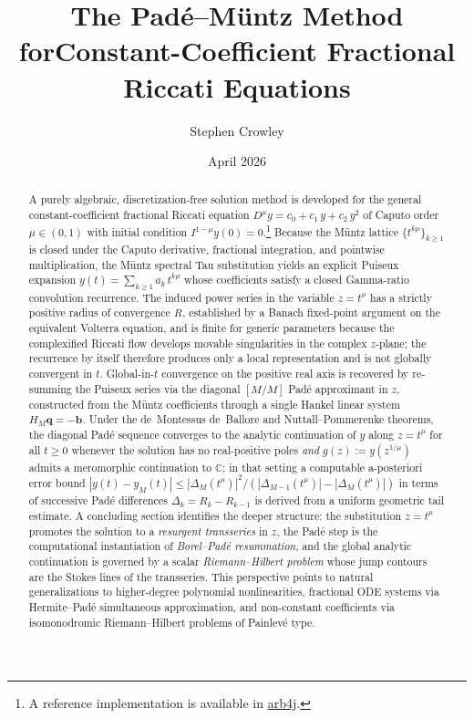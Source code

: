\documentclass[11pt,a4paper]{article}
\title{The Pad\'e--M\"untz Method forConstant-Coefficient Fractional Riccati Equations}}
\author{Stephen Crowley}
\date{April 2026}
\newcommand{\C}{\mathbb{C}}
\begin{document}
\maketitle

\begin{abstract}
A purely algebraic, discretization-free solution method is developed for the general constant-coefficient fractional Riccati equation
\(D^\mu y = c_0 + c_1\,y + c_2\,y^2\) of Caputo order \(\mu \in (0,1)\) with initial condition \(I^{1-\mu}y(0)=0\).\footnote{A reference implementation is available in \href{https://github.com/crowlogic/arb4j/blob/master/src/main/java/arb/equations/ConstantCoefficientFractionalRiccatiEquation.java}{arb4j}.}
Because the M\"untz lattice \(\{t^{k\mu}\}_{k\ge1}\) is closed under the Caputo derivative, fractional integration, and pointwise multiplication, the M\"untz spectral Tau substitution yields an explicit Puiseux expansion \(y(t)=\sum_{k\ge1} a_k\,t^{k\mu}\) whose coefficients satisfy a closed Gamma-ratio convolution recurrence.
The induced power series in the variable \(z=t^\mu\) has a strictly positive radius of convergence \(R\), established by a Banach fixed-point argument on the equivalent Volterra equation, and is finite for generic parameters because the complexified Riccati flow develops movable singularities in the complex \(z\)-plane; the recurrence by itself therefore produces only a local representation and is not globally convergent in \(t\).
Global-in-\(t\) convergence on the positive real axis is recovered by re-summing the Puiseux series via the diagonal \([M/M]\) Pad\'e approximant in \(z\), constructed from the M\"untz coefficients through a single Hankel linear system \(H_M\bm{q}=-\bm{b}\).
Under the de~Montessus de~Ballore and Nuttall--Pommerenke theorems, the diagonal Pad\'e sequence converges to the analytic continuation of \(y\) along \(z=t^\mu\) for all \(t\ge0\) whenever the solution has no real-positive poles \emph{and} \(g(z):=y(z^{1/\mu})\) admits a meromorphic continuation to \(\C\); in that setting a computable a-posteriori error bound
\(|y(t)-y_M(t)|\le |\Delta_M(t^\mu)|^2/(|\Delta_{M-1}(t^\mu)|-|\Delta_M(t^\mu)|)\)
in terms of successive Pad\'e differences \(\Delta_k=R_k-R_{k-1}\) is derived from a uniform geometric tail estimate.
A concluding section identifies the deeper structure: the substitution \(z=t^\mu\) promotes the solution to a \emph{resurgent transseries} in \(z\), the Pad\'e step is the computational instantiation of \emph{Borel--Pad\'e resummation}, and the global analytic continuation is governed by a scalar \emph{Riemann--Hilbert problem} whose jump contours are the Stokes lines of the transseries.
This perspective points to natural generalizations to higher-degree polynomial nonlinearities, fractional ODE systems via Hermite--Pad\'e simultaneous approximation, and non-constant coefficients via isomonodromic Riemann--Hilbert problems of Painlev\'e type.
\end{abstract}
\end{document}
